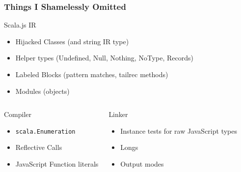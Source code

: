 \documentclass{beamer}
\begin{document}
\begin{frame}
  \frametitle{Things I Shamelessly Omitted}

  \begin{block}{Scala.js IR}
    \begin{itemize}
    \item Hijacked Classes (and string IR type)
    \item Helper types (Undefined, Null, Nothing, NoType, Records)
    \item Labeled Blocks (pattern matches, tailrec methods)
    \item Modules (objects)
    \end{itemize}
  \end{block}

  \begin{columns}[t]
    \begin{block}{Compiler}
      \begin{itemize}
      \item \texttt{scala.Enumeration}
      \item Reflective Calls
      \item JavaScript Function literals
      \end{itemize}
    \end{block}

    \begin{block}{Linker}
      \begin{itemize}
      \item Instance tests for raw JavaScript types
      \item Longs
      \item Output modes
      \end{itemize}
    \end{block}
  \end{columns}

\end{frame}
\end{document}
